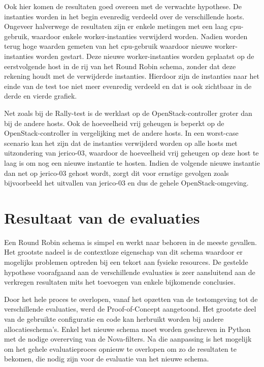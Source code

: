 Ook hier komen de resultaten goed overeen met de verwachte hypothese. De instanties worden in het begin evenredig verdeeld over de verschillende hosts. Ongeveer halverwege de resultaten zijn er enkele metingen met een laag cpu-gebruik, waardoor enkele worker-instanties verwijderd worden. Nadien worden terug hoge waarden gemeten van het cpu-gebruik waardoor nieuwe worker-instanties worden gestart. Deze nieuwe worker-instanties worden geplaatst op de eerstvolgende host in de rij van het Round Robin schema, zonder dat deze rekening houdt met de verwijderde instanties. Hierdoor zijn de instanties naar het einde van de test toe niet meer evenredig verdeeld en dat is ook zichtbaar in de derde en vierde grafiek.

Net zoals bij de Rally-test is de werklast op de OpenStack-controller groter dan bij de andere hosts. Ook de hoeveelheid vrij geheugen is beperkt op de OpenStack-controller in vergelijking met de andere hosts. In een worst-case scenario kan het zijn dat de instanties verwijderd worden op alle hosts met uitzondering van jerico-03, waardoor de hoeveelheid vrij geheugen op deze host te laag is om nog een nieuwe instantie te hosten. Indien de volgende nieuwe instantie dan net op jerico-03 gehost wordt, zorgt dit voor ernstige gevolgen zoals bijvoorbeeld het uitvallen van jerico-03 en dus de gehele OpenStack-omgeving.


\section{Resultaat van de evaluaties}

Een Round Robin schema is simpel en werkt naar behoren in de meeste gevallen. Het grootste nadeel is de contextloze eigenschap van dit schema waardoor er mogelijks problemen optreden bij een tekort aan fysieke resources. De gestelde hypothese voorafgaand aan de verschillende evaluaties is zeer aansluitend aan de verkregen resultaten mits het toevoegen van enkele bijkomende conclusies.

Door het hele proces te overlopen, vanaf het opzetten van de testomgeving tot de verschillende evaluaties, werd de Proof-of-Concept aangetoond. Het grootste deel van de gebruikte configuratie en code kan herbruikt worden bij andere allocatieschema's. Enkel het nieuwe schema moet worden geschreven in Python met de nodige overerving van de Nova-filters. Na die aanpassing is het mogelijk om het gehele evaluatieproces opnieuw te overlopen om zo de resultaten te bekomen, die nodig zijn voor de evaluatie van het nieuwe schema.

